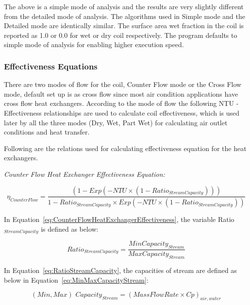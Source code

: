 The above is a simple mode of analysis and the results are very slightly different from the detailed mode of analysis. The algorithms used in Simple mode and the Detailed mode are identically similar. The surface area wet fraction in the coil is reported as 1.0 or 0.0 for wet or dry coil respectively. The program defaults to simple mode of analysis for enabling higher execution speed.

\subsubsection{Effectiveness Equations}\label{effectiveness-equations}

There are two modes of flow for the coil, Counter Flow mode or the Cross Flow mode, default set up is as cross flow since most air condition applications have cross flow heat exchangers. According to the mode of flow the following NTU - Effectiveness relationships are used to calculate coil effectiveness, which is used later by all the three modes (Dry, Wet, Part Wet) for calculating air outlet conditions and heat transfer.

Following are the relations used for calculating effectiveness equation for the heat exchangers.

\emph{Counter Flow Heat Exchanger Effectiveness Equation:}

\begin{equation}
{\eta_{CounterFlow}} = \frac{{(1 - Exp( - NTU \times (1 - Rati{o_{StreamCapacity}})))}}{{1 - Rati{o_{StreamCapacity}} \times Exp( - NTU \times (1 - Rati{o_{StreamCapacity}}))}}
\label{eq:CounterFlowHeatExchangerEffectiveness}
\end{equation}

In Equation~\ref{eq:CounterFlowHeatExchangerEffectiveness}, the variable Ratio\(_{StreamCapacity}\) is defined as below:

\begin{equation}
Rati{o_{StreamCapacity}} = \frac{{MinCapacit{y_{Stream}}}}{{MaxCapacit{y_{Stream}}}}
\label{eq:RatioStreamCapacity}
\end{equation}

In Equation~\ref{eq:RatioStreamCapacity}, the capacities of stream are defined as below in Equation~\ref{eq:MinMaxCapacityStream}:

\begin{equation}
(Min,Max)\,\,Capacit{y_{Stream}} = {(MassFlowRate \times Cp)_{air,water}}
\label{eq:MinMaxCapacityStream}
\end{equation}

